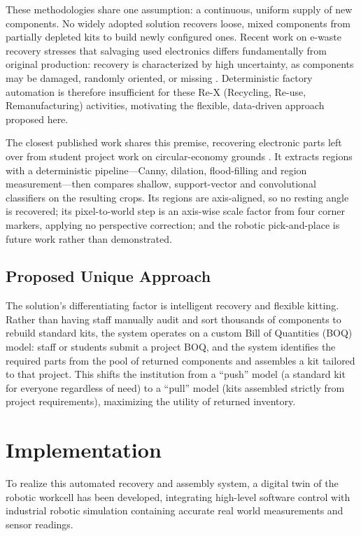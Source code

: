 \documentclass[conference]{IEEEtran}
\begin{document}
These methodologies share one assumption: a continuous, uniform supply of new components. No widely adopted solution recovers loose, mixed components from partially depleted kits to build newly configured ones. Recent work on e-waste recovery stresses that salvaging used electronics differs fundamentally from original production: recovery is characterized by high uncertainty, as components may be damaged, randomly oriented, or missing \cite{saenz}. Deterministic factory automation is therefore insufficient for these Re-X (Recycling, Re-use, Remanufacturing) activities, motivating the flexible, data-driven approach proposed here.

The closest published work shares this premise, recovering electronic parts left over from student project work on circular-economy grounds \cite{chand2022}. It extracts regions with a deterministic pipeline---Canny, dilation, flood-filling and region measurement---then compares shallow, support-vector and convolutional classifiers on the resulting crops. Its regions are axis-aligned, so no resting angle is recovered; its pixel-to-world step is an axis-wise scale factor from four corner markers, applying no perspective correction; and the robotic pick-and-place is future work rather than demonstrated.

\subsection{Proposed Unique Approach}
The solution's differentiating factor is intelligent recovery and flexible kitting. Rather than having staff manually audit and sort thousands of components to rebuild standard kits, the system operates on a custom Bill of Quantities (BOQ) model: staff or students submit a project BOQ, and the system identifies the required parts from the pool of returned components and assembles a kit tailored to that project. This shifts the institution from a ``push'' model (a standard kit for everyone regardless of need) to a ``pull'' model (kits assembled strictly from project requirements), maximizing the utility of returned inventory.

\section{Implementation}
To realize this automated recovery and assembly system, a digital twin of the robotic workcell has been developed, integrating high-level software control with industrial robotic simulation containing accurate real world measurements and sensor readings.
\end{document}

